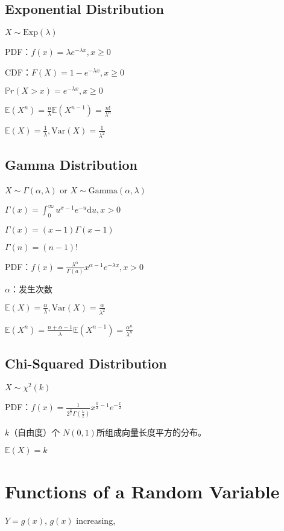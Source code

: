 \documentclass[9pt,landscape]{article}
\begin{document}
\begin{multicols}{3}
\subsection{Exponential Distribution}

$X\sim \mathrm{Exp}(\lambda)$

PDF：$f(x)=\lambda e^{-\lambda x}, x\ge 0$

CDF：$F(X)=1-e^{-\lambda x}, x\ge 0$

$\mathbb{P}r(X>x)=e^{-\lambda x}, x\ge 0$

$\mathbb{E}(X^n)=\frac{n}{\lambda}\mathbb{E}(X^{n-1})=\frac{n!}{\lambda^n}$

$\mathbb{E}(X)=\frac{1}{\lambda}, \mathrm{Var}(X)=\frac{1}{\lambda^2}$

\subsection{Gamma Distribution}

$X\sim \Gamma(\alpha, \lambda)$ or $X\sim \mathrm{Gamma}(\alpha, \lambda)$

$\Gamma(x)=\int_{0}^{\infty}u^{x-1}e^{-u}\mathrm{d}u, x>0$

$\Gamma(x)=(x-1)\Gamma(x - 1)$

$\Gamma(n)=(n-1)!$

PDF：$f(x)=\frac{\lambda^\alpha}{\Gamma(a)}x^{\alpha - 1}e^{-\lambda x}, x>0$

$\alpha$：发生次数

$\mathbb{E}(X)=\frac{\alpha}{\lambda}, \mathrm{Var}(X)=\frac{\alpha}{\lambda^2}$

$\mathbb{E}(X^n)=\frac{n+\alpha-1}{\lambda}\mathbb{E}(X^{n-1})=\frac{\alpha^{\overline{n}}}{\lambda^n}$

\subsection{Chi-Squared Distribution}

$X\sim \chi^2(k)$

PDF：$f(x)=\frac{1}{2^{\frac{k}{2}}\Gamma\left(\frac{k}{2}\right)}x^{\frac{k}{2}-1}e^{-\frac{x}{2}}$

$k$（自由度）个 $N(0, 1)$所组成向量长度平方的分布。

$\mathbb{E}(X)=k$

\section{Functions of a Random Variable}
$Y=g(x)$, $g(x)$ increasing,


\end{multicols}
\end{document}
